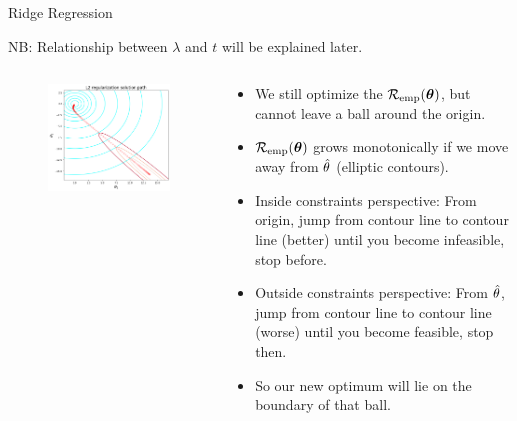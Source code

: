\documentclass[11pt,compress,t,notes=noshow, xcolor=table]{beamer}
\begin{document}
\begin{vbframe}{Ridge Regression}
\begin{footnotesize} 
NB: Relationship between $\lambda$ and $t$ will be explained later.
\end{footnotesize}

\framebreak
  
\begin{columns}
\begin{column}{0.5\textwidth}
\lz
\begin{figure}
\includegraphics[width=\textwidth]{figure_man/solution-path-ridge-only.png}
\end{figure}
\end{column}

\begin{column}{0.5\textwidth}
\begin{footnotesize} 
\begin{itemize}
  \item We still optimize the $\mathcal{R}_{\text{emp}}(\bm{\theta})$, but cannot leave a ball around the origin.
  \item $\mathcal{R}_{\text{emp}}(\bm{\theta})$ grows monotonically if we move away from $\hat{\theta}$ (elliptic contours).
  \item Inside constraints perspective: From origin, jump from contour line to contour line (better) until you become infeasible, stop before.
\item Outside constraints perspective: From $\hat{\theta}$, jump from contour line to contour line (worse) until you become feasible, stop then.
  \item So our new optimum will lie on the boundary of that ball.
\end{itemize}
\end{footnotesize}
\end{column}
\end{columns}


\end{vbframe}
\end{document}
